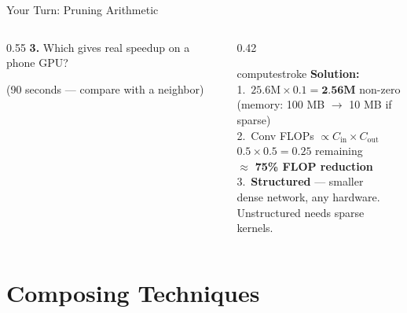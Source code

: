 \documentclass[aspectratio=169, 12pt]{beamer}
\begin{document}
\begin{frame}{Your Turn: Pruning Arithmetic}
\begin{columns}[T]
\begin{column}{0.55\textwidth}
    \vspace{0.05cm}
    \textbf{3.} Which gives real speedup on a phone GPU?

    \vspace{0.1cm}
    {\scriptsize\textcolor{midgray}{(90 seconds --- compare with a neighbor)}}
  \end{column}
  \begin{column}{0.42\textwidth}
    \pause
    \begin{mlsyscard}{computestroke}
    {\scriptsize \textbf{Solution:}\\[0.05cm]
    1.\ $25.6\text{M} \times 0.1 = \textbf{2.56M}$ non-zero\\
    \hspace{0.3cm}(memory: 100 MB $\to$ 10 MB if sparse)\\[0.05cm]
    2.\ Conv FLOPs $\propto C_{\text{in}} \times C_{\text{out}}$\\
    \hspace{0.3cm}$0.5 \times 0.5 = 0.25$ remaining\\
    \hspace{0.3cm}$\approx$ \textbf{75\% FLOP reduction}\\[0.05cm]
    3.\ \textcolor{datastroke}{\textbf{Structured}} --- smaller\\
    \hspace{0.3cm}dense network, any hardware.\\
    \hspace{0.3cm}Unstructured needs sparse kernels.
    }
    \end{mlsyscard}
  \end{column}
\end{columns}

\end{frame}

\section{Composing Techniques}
\end{document}
